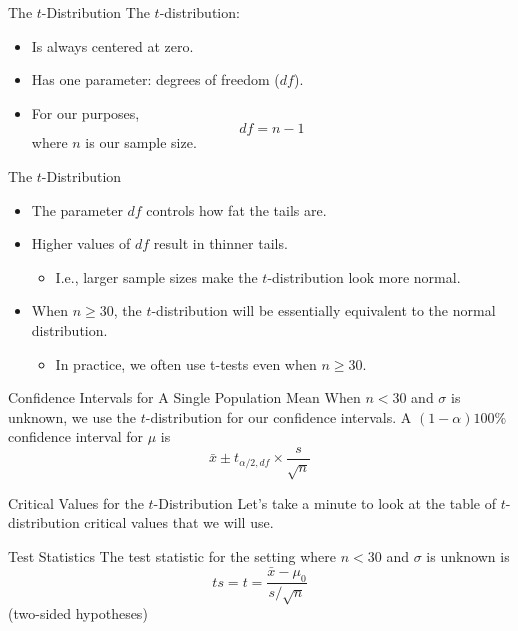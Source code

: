 \begin{frame}{The $t$-Distribution}
    The $t$-distribution:
    \begin{itemize}
        \item Is always centered at zero.
        \item Has one parameter: degrees of freedom ($df$).
        \item For our purposes,
        \[
            df = n-1
        \]
        where $n$ is our sample size.
    \end{itemize}
\end{frame}

\begin{frame}{The $t$-Distribution}
    \begin{itemize}
        \item The parameter $df$ controls how fat the tails are.
        \item Higher values of $df$ result in thinner tails.
        \begin{itemize}
            \item I.e., larger sample sizes make the $t$-distribution look more normal.
        \end{itemize}
        \item When $n \ge 30$, the $t$-distribution will be essentially equivalent to the normal distribution.
        \begin{itemize}
            \item In practice, we often use t-tests even when $n \ge 30$.
        \end{itemize}
    \end{itemize}
\end{frame}

\begin{frame}{Confidence Intervals for A Single Population Mean}
    When $n < 30$ and $\sigma$ is unknown, we use the $t$-distribution for our confidence intervals. A $(1-\alpha)100\%$ confidence interval for $\mu$ is
    \[
        \bar{x} \pm t_{\alpha/2, df} \times \frac{s}{\sqrt{n}}
    \]
\end{frame}

\begin{frame}{Critical Values for the $t$-Distribution}
    Let's take a minute to look at the table of $t$-distribution critical values that we will use.
\end{frame}

\begin{frame}{Test Statistics}
    The test statistic for the setting where $n < 30$ and $\sigma$ is unknown is
    \[
        ts = t = \frac{\bar{x}-\mu_0}{s/\sqrt{n}}
    \]
    (two-sided hypotheses)
\end{frame}

